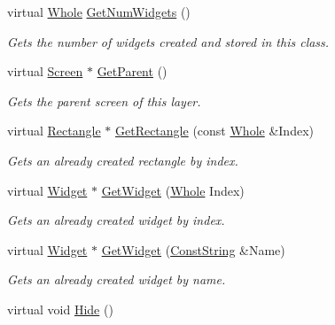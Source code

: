 \begin{DoxyCompactItemize}
virtual \hyperlink{namespacephys_a460f6bc24c8dd347b05e0366ae34f34a}{Whole} \hyperlink{classphys_1_1UI_1_1Layer_a9501026d0546e37f2f7989a555f47500}{GetNumWidgets} ()
\begin{DoxyCompactList}\small\item\em Gets the number of widgets created and stored in this class. \item\end{DoxyCompactList}\item 
virtual \hyperlink{classphys_1_1UI_1_1Screen}{Screen} $\ast$ \hyperlink{classphys_1_1UI_1_1Layer_a484d10cf74177dea47d00ad7ddef8527}{GetParent} ()
\begin{DoxyCompactList}\small\item\em Gets the parent screen of this layer. \item\end{DoxyCompactList}\item 
virtual \hyperlink{classphys_1_1UI_1_1Rectangle}{Rectangle} $\ast$ \hyperlink{classphys_1_1UI_1_1Layer_ac96bb33f2c47d3ab1b615fc91aa5ad91}{GetRectangle} (const \hyperlink{namespacephys_a460f6bc24c8dd347b05e0366ae34f34a}{Whole} \&Index)
\begin{DoxyCompactList}\small\item\em Gets an already created rectangle by index. \item\end{DoxyCompactList}\item 
virtual \hyperlink{classphys_1_1UI_1_1Widget}{Widget} $\ast$ \hyperlink{classphys_1_1UI_1_1Layer_a8506cbb9fda26895300e4ade376754ab}{GetWidget} (\hyperlink{namespacephys_a460f6bc24c8dd347b05e0366ae34f34a}{Whole} Index)
\begin{DoxyCompactList}\small\item\em Gets an already created widget by index. \item\end{DoxyCompactList}\item 
virtual \hyperlink{classphys_1_1UI_1_1Widget}{Widget} $\ast$ \hyperlink{classphys_1_1UI_1_1Layer_a4340e70c9ab4083236d4a4c8d804c62a}{GetWidget} (\hyperlink{namespacephys_a5ce5049f8b4bf88d6413c47b504ebb31}{ConstString} \&Name)
\begin{DoxyCompactList}\small\item\em Gets an already created widget by name. \item\end{DoxyCompactList}\item 
\hypertarget{classphys_1_1UI_1_1Layer_ad69fc503170e52b2248f76a87f57a2b8}{
virtual void \hyperlink{classphys_1_1UI_1_1Layer_ad69fc503170e52b2248f76a87f57a2b8}{Hide} ()}
\label{classphys_1_1UI_1_1Layer_ad69fc503170e52b2248f76a87f57a2b8}


\end{DoxyCompactItemize}
